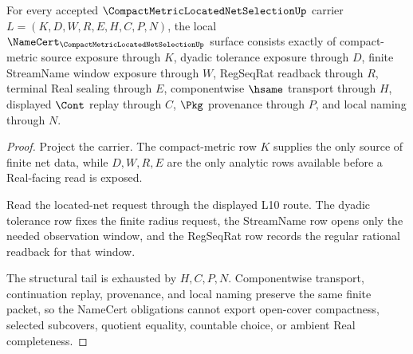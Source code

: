 \begin{theorem}
\label{thm:compact-metric-located-net-selection-obligations}
For every accepted $\CompactMetricLocatedNetSelectionUp$ carrier $L=(K,D,W,R,E,H,C,P,N)$, the local $\NameCert_{\CompactMetricLocatedNetSelectionUp}$ surface consists exactly of compact-metric source exposure through $K$, dyadic tolerance exposure through $D$, finite StreamName window exposure through $W$, RegSeqRat readback through $R$, terminal Real sealing through $E$, componentwise $\hsame$ transport through $H$, displayed $\Cont$ replay through $C$, $\Pkg$ provenance through $P$, and local naming through $N$.
\end{theorem}
\begin{proof}
Project the carrier. The compact-metric row $K$ supplies the only source of finite net data, while $D,W,R,E$ are the only analytic rows available before a Real-facing read is exposed.

Read the located-net request through the displayed L10 route. The dyadic tolerance row fixes the finite radius request, the StreamName row opens only the needed observation window, and the RegSeqRat row records the regular rational readback for that window.

The structural tail is exhausted by $H,C,P,N$. Componentwise transport, continuation replay, provenance, and local naming preserve the same finite packet, so the NameCert obligations cannot export open-cover compactness, selected subcovers, quotient equality, countable choice, or ambient Real completeness.
\end{proof}

